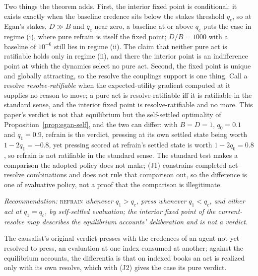 \noindent Two things the theorem adds. First, the interior fixed point is conditional: it exists exactly when the baseline credence sits below the stakes threshold $q_c$, so at Egan's stakes, $D \gg B$ and $q_c$ near zero, a baseline at or above $q_c$ puts the case in regime (i), where pure refrain is itself the fixed point; $D/B = 1000$ with a baseline of $10^{-6}$ still lies in regime (ii). The claim that neither pure act is ratifiable holds only in regime (ii), and there the interior point is an indifference point at which the dynamics select no pure act. Second, the fixed point is unique and globally attracting, so the resolve the couplings support is one thing. Call a resolve \emph{resolve-ratifiable} when the expected-utility gradient computed at it supplies no reason to move; a pure act is resolve-ratifiable iff it is ratifiable in the standard sense, and the interior fixed point is resolve-ratifiable and no more. This paper's verdict is not that equilibrium but the self-settled optimality of Proposition~\ref{prop:egan-self}, and the two can differ: with $B = D = 1$, $q_0 = 0.1$ and $q_1 = 0.9$, refrain is the verdict, pressing at its own settled state being worth $1 - 2q_1 = -0.8$, yet pressing scored at refrain's settled state is worth $1 - 2q_0 = 0.8$, so refrain is not ratifiable in the standard sense. The standard test makes a comparison the adopted policy does not make; (J1) constrains completed act--resolve combinations and does not rule that comparison out, so the difference is one of evaluative policy, not a proof that the comparison is illegitimate.
\begin{center}\emph{Recommendation: }\textsc{refrain}\emph{ whenever $q_1 > q_c$, press whenever $q_1 < q_c$, and either act at $q_1 = q_c$, by self-settled evaluation; the interior fixed point of the current-resolve map describes the equilibrium accounts' deliberation and is not a verdict.}\end{center}
The causalist's original verdict presses with the credences of an agent not yet resolved to press, an evaluation at one index consumed at another; against the equilibrium accounts, the differentia is that on indexed books an act is realized only with its own resolve, which with (J2) gives the case its pure verdict.

